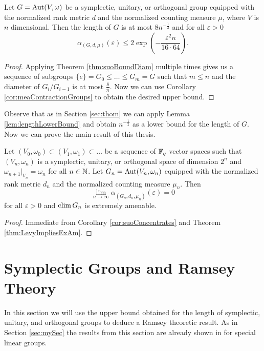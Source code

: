 \begin{corollary}\label{cor:suoConcentrates}
Let $G=\operatorname{Aut}(V,\omega)$ be a symplectic, unitary, or orthogonal group equipped with the normalized rank metric $d$ and the normalized counting measure $\mu$, where $V$ is $n$ dimensional. Then the length of $G$ is at most $8n^{-\frac{1}{2}}$ and for all $\varepsilon>0$
\[\alpha_{(G,d,\mu)}(\varepsilon)\leq 2\exp\left(-\frac{\varepsilon^2n}{16\cdot64}\right).\]
\end{corollary}
\begin{proof}
Applying Theorem \ref{thm:suoBoundDiam} multiple times gives us a sequence of subgroups $\{e\}=G_0\leq \dots\leq G_m=G$ such that $m\leq n$ and the diameter of $G_i/G_{i-1}$ is at most $\frac{8}{n}$. Now we can use Corollary \ref{cor:meaContractionGroups} to obtain the desired upper bound.
\end{proof}
Observe that as in Section \ref{sec:thom} we can apply Lemma \ref{lem:lengthLowerBound} and obtain $n^{-\frac{1}{2}}$ as a lower bound for the length of $G$.
Now we can prove the main result of this thesis.
\begin{corollary}
Let $(V_0,\omega_0)\subset (V_1,\omega_1)\subset \dots$ be a sequence of $\mathbb{F}_q$ vector spaces such that $(V_n,\omega_n)$ is a symplectic, unitary, or orthogonal space of dimension $2^n$ and $\omega_{n+1}|_{V_n}=\omega_n$ for all $n\in\mathbb{N}$. Let $G_{n}=\operatorname{Aut}(V_n,\omega_n)$ equipped with the normalized rank metric $d_n$ and the normalized counting measure $\mu_n$. 
Then \[\lim_{n\to\infty}\alpha_{(G_n,d_n,\mu_n)}(\varepsilon)=0\] for all $\varepsilon>0$ and $\operatorname{clim} G_n$ is extremely amenable.
\end{corollary}
\begin{proof}
Immediate from Corollary \ref{cor:suoConcentrates} and Theorem \ref{thm:LevyImpliesExAm}.
\end{proof}

\section{Symplectic Groups and Ramsey Theory}\label{sec:ramsey}
In this section we will use the upper bound obtained for the length of symplectic, unitary, and orthogonal groups to deduce a Ramsey theoretic result. %
As in Section \ref{sec:mySec} the results from this section are already shown in \cite{thom} for special linear groups. 

